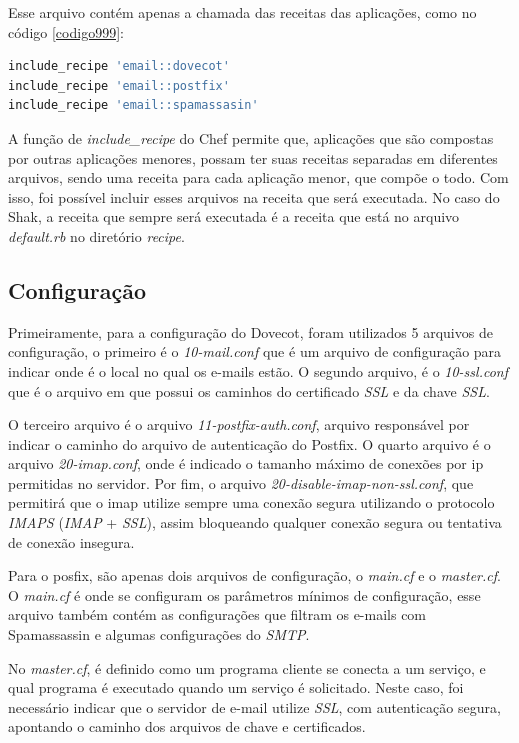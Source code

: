 Esse arquivo contém apenas a chamada das receitas das aplicações, como no código \ref{codigo999}:

\begin{lstlisting}[basicstyle=\ttfamily, language=Ruby,label=dice_index,caption={Exemplo da receita de e-mail
composta pelas receitas das outras aplicações}, label=codigo999]
include_recipe 'email::dovecot'
include_recipe 'email::postfix'
include_recipe 'email::spamassasin'
\end{lstlisting}

A função de \textit{include\_recipe} do Chef permite que, aplicações que são compostas
por outras aplicações menores, possam ter suas receitas separadas em diferentes arquivos,
sendo uma receita para cada aplicação menor, que compõe o todo. Com isso, foi possível 
incluir esses arquivos na receita que será executada. No caso do Shak, a receita
que sempre será executada é a receita que está no arquivo \textit{default.rb} no diretório \textit{recipe}.

\subsection{Configuração}

Primeiramente, para a configuração do Dovecot, foram utilizados 5 arquivos
de configuração, o primeiro é o \textit{10-mail.conf} que é um arquivo de configuração para
indicar onde é o local no qual os e-mails estão. O segundo arquivo, é o \textit{10-ssl.conf}
que é o arquivo em que possui os caminhos do certificado \textit{SSL} e da chave \textit{SSL}.

O terceiro arquivo é o arquivo \textit{11-postfix-auth.conf}, arquivo responsável por 
indicar o caminho do arquivo de autenticação
do Postfix. O quarto arquivo é o arquivo \textit{20-imap.conf}, onde é indicado o tamanho
máximo de conexões por ip permitidas no servidor. Por fim, o arquivo
\textit{20-disable-imap-non-ssl.conf}, que permitirá que o imap utilize sempre uma conexão
segura utilizando o protocolo \textit{IMAPS} (\textit{IMAP} + \textit{SSL}), assim bloqueando 
qualquer conexão segura ou tentativa de conexão insegura.

Para o posfix, são apenas dois arquivos de configuração, o \textit{main.cf} e o 
\textit{master.cf}.
O \textit{main.cf} é onde se configuram os parâmetros mínimos de configuração, esse arquivo
também contém as configurações que filtram os e-mails com Spamassassin e 
algumas configurações do \textit{SMTP}. 

No \textit{master.cf}, é definido como um programa cliente se conecta a um serviço, e qual
programa é executado quando um serviço é solicitado. Neste caso, foi necessário
indicar que o servidor de e-mail utilize \textit{SSL}, com autenticação segura, 
apontando o caminho dos arquivos de chave e certificados.

